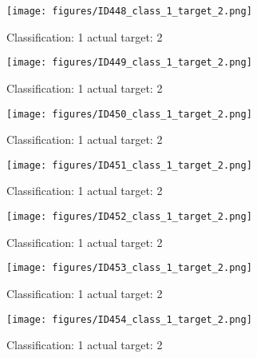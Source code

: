 \begin{figure}[h!]
\begin{center}
\texttt{[image: figures/ID448\_class\_1\_target\_2.png]}
\end{center}
\caption{ Classification: 1 actual target: 2}
\label{fig:ID448_class_1_target_2}
\end{figure}
\begin{figure}[h!]
\begin{center}
\texttt{[image: figures/ID449\_class\_1\_target\_2.png]}
\end{center}
\caption{ Classification: 1 actual target: 2}
\label{fig:ID449_class_1_target_2}
\end{figure}
\begin{figure}[h!]
\begin{center}
\texttt{[image: figures/ID450\_class\_1\_target\_2.png]}
\end{center}
\caption{ Classification: 1 actual target: 2}
\label{fig:ID450_class_1_target_2}
\end{figure}
\begin{figure}[h!]
\begin{center}
\texttt{[image: figures/ID451\_class\_1\_target\_2.png]}
\end{center}
\caption{ Classification: 1 actual target: 2}
\label{fig:ID451_class_1_target_2}
\end{figure}
\begin{figure}[h!]
\begin{center}
\texttt{[image: figures/ID452\_class\_1\_target\_2.png]}
\end{center}
\caption{ Classification: 1 actual target: 2}
\label{fig:ID452_class_1_target_2}
\end{figure}
\begin{figure}[h!]
\begin{center}
\texttt{[image: figures/ID453\_class\_1\_target\_2.png]}
\end{center}
\caption{ Classification: 1 actual target: 2}
\label{fig:ID453_class_1_target_2}
\end{figure}
\begin{figure}[h!]
\begin{center}
\texttt{[image: figures/ID454\_class\_1\_target\_2.png]}
\end{center}
\caption{ Classification: 1 actual target: 2}
\label{fig:ID454_class_1_target_2}
\end{figure}
